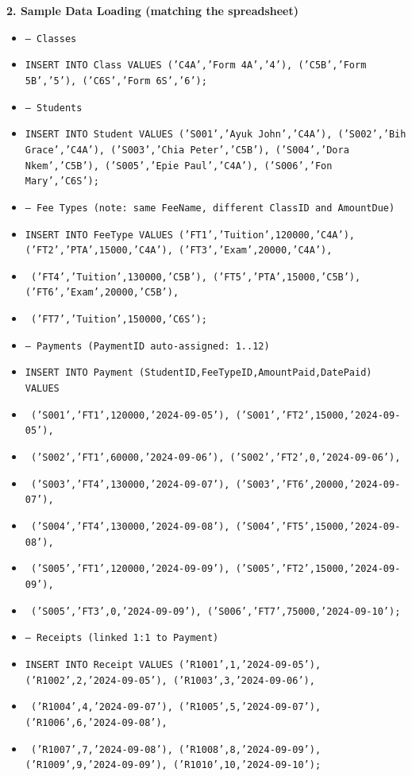 \documentclass[11pt]{article}
\begin{document}
\begin{exoresolu}
\textbf{2. Sample Data Loading (matching the spreadsheet)}\par
\begin{methode}
\begin{itemize}
    \item \texttt{-- Classes}
    \item \texttt{INSERT INTO Class VALUES ('C4A','Form 4A','4'), ('C5B','Form 5B','5'), ('C6S','Form 6S','6');}
    \item \texttt{-- Students}
    \item \texttt{INSERT INTO Student VALUES ('S001','Ayuk John','C4A'), ('S002','Bih Grace','C4A'), ('S003','Chia Peter','C5B'), ('S004','Dora Nkem','C5B'), ('S005','Epie Paul','C4A'), ('S006','Fon Mary','C6S');}
    \item \texttt{-- Fee Types (note: same FeeName, different ClassID and AmountDue)}
    \item \texttt{INSERT INTO FeeType VALUES ('FT1','Tuition',120000,'C4A'), ('FT2','PTA',15000,'C4A'), ('FT3','Exam',20000,'C4A'),}
    \item \texttt{    ('FT4','Tuition',130000,'C5B'), ('FT5','PTA',15000,'C5B'), ('FT6','Exam',20000,'C5B'),}
    \item \texttt{    ('FT7','Tuition',150000,'C6S');}
    \item \texttt{-- Payments (PaymentID auto-assigned: 1..12)}
    \item \texttt{INSERT INTO Payment (StudentID,FeeTypeID,AmountPaid,DatePaid) VALUES}
    \item \texttt{    ('S001','FT1',120000,'2024-09-05'), ('S001','FT2',15000,'2024-09-05'),}
    \item \texttt{    ('S002','FT1',60000,'2024-09-06'), ('S002','FT2',0,'2024-09-06'),}
    \item \texttt{    ('S003','FT4',130000,'2024-09-07'), ('S003','FT6',20000,'2024-09-07'),}
    \item \texttt{    ('S004','FT4',130000,'2024-09-08'), ('S004','FT5',15000,'2024-09-08'),}
    \item \texttt{    ('S005','FT1',120000,'2024-09-09'), ('S005','FT2',15000,'2024-09-09'),}
    \item \texttt{    ('S005','FT3',0,'2024-09-09'), ('S006','FT7',75000,'2024-09-10');}
    \item \texttt{-- Receipts (linked 1:1 to Payment)}
    \item \texttt{INSERT INTO Receipt VALUES ('R1001',1,'2024-09-05'), ('R1002',2,'2024-09-05'), ('R1003',3,'2024-09-06'),}
    \item \texttt{    ('R1004',4,'2024-09-07'), ('R1005',5,'2024-09-07'), ('R1006',6,'2024-09-08'),}
    \item \texttt{    ('R1007',7,'2024-09-08'), ('R1008',8,'2024-09-09'), ('R1009',9,'2024-09-09'), ('R1010',10,'2024-09-10');}
\end{itemize}
\end{methode}
\end{exoresolu}
\end{document}
